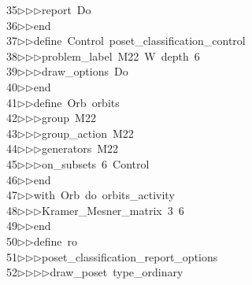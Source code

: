 \begin{tabbing}
35\>$\triangleright$\>$\triangleright$\>$\triangleright$\>report\ Do\ \\[0pt]
36\>$\triangleright$\>$\triangleright$\>end\ \\[0pt]
37\>$\triangleright$\>$\triangleright$\>define\ Control\ poset\_classification\_control\ \\[0pt]
38\>$\triangleright$\>$\triangleright$\>$\triangleright$\>problem\_label\ M22\ W\ depth\ 6\ \\[0pt]
39\>$\triangleright$\>$\triangleright$\>$\triangleright$\>draw\_options\ Do\ \\[0pt]
40\>$\triangleright$\>$\triangleright$\>end\ \\[0pt]
41\>$\triangleright$\>$\triangleright$\>define\ Orb\ orbits\ \\[0pt]
42\>$\triangleright$\>$\triangleright$\>$\triangleright$\>group\ M22\ \\[0pt]
43\>$\triangleright$\>$\triangleright$\>$\triangleright$\>group\_action\ M22\ \\[0pt]
44\>$\triangleright$\>$\triangleright$\>$\triangleright$\>generators\ M22\ \\[0pt]
45\>$\triangleright$\>$\triangleright$\>$\triangleright$\>on\_subsets\ 6\ Control\ \\[0pt]
46\>$\triangleright$\>$\triangleright$\>end\ \\[0pt]
47\>$\triangleright$\>$\triangleright$\>with\ Orb\ do\ orbits\_activity\ \\[0pt]
48\>$\triangleright$\>$\triangleright$\>$\triangleright$\>Kramer\_Mesner\_matrix\ 3\ 6\ \\[0pt]
49\>$\triangleright$\>$\triangleright$\>end\ \\[0pt]
50\>$\triangleright$\>$\triangleright$\>define\ ro\ \\[0pt]
51\>$\triangleright$\>$\triangleright$\>$\triangleright$\>poset\_classification\_report\_options\ \\[0pt]
52\>$\triangleright$\>$\triangleright$\>$\triangleright$\>$\triangleright$\>draw\_poset\ type\_ordinary\ \\[0pt]

\end{tabbing}
